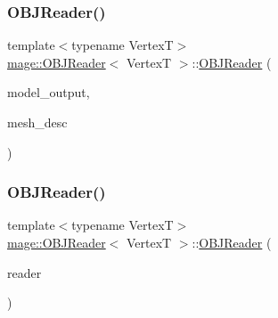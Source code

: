 \subsubsection{\texorpdfstring{O\+B\+J\+Reader()}{OBJReader()}\hspace{0.1cm}{\footnotesize\ttfamily [1/3]}}
{\footnotesize\ttfamily template$<$typename VertexT$>$ \\
\hyperlink{classmage_1_1_o_b_j_reader}{mage\+::\+O\+B\+J\+Reader}$<$ VertexT $>$\+::\hyperlink{classmage_1_1_o_b_j_reader}{O\+B\+J\+Reader} (\begin{DoxyParamCaption}\item[{\hyperlink{structmage_1_1_model_output}{Model\+Output}$<$ VertexT $>$ \&}]{model\+\_\+output,  }\item[{const \hyperlink{structmage_1_1_mesh_descriptor}{Mesh\+Descriptor}$<$ VertexT $>$ \&}]{mesh\+\_\+desc }\end{DoxyParamCaption})\hspace{0.3cm}{\ttfamily [explicit]}}

\hypertarget{classmage_1_1_o_b_j_reader_a8864bc1ca0520bf90e216415db772bbb}{}\label{classmage_1_1_o_b_j_reader_a8864bc1ca0520bf90e216415db772bbb} 
\subsubsection{\texorpdfstring{O\+B\+J\+Reader()}{OBJReader()}\hspace{0.1cm}{\footnotesize\ttfamily [2/3]}}
{\footnotesize\ttfamily template$<$typename VertexT$>$ \\
\hyperlink{classmage_1_1_o_b_j_reader}{mage\+::\+O\+B\+J\+Reader}$<$ VertexT $>$\+::\hyperlink{classmage_1_1_o_b_j_reader}{O\+B\+J\+Reader} (\begin{DoxyParamCaption}\item[{const \hyperlink{classmage_1_1_o_b_j_reader}{O\+B\+J\+Reader}$<$ VertexT $>$ \&}]{reader }\end{DoxyParamCaption})\hspace{0.3cm}{\ttfamily [delete]}}

\hypertarget{classmage_1_1_o_b_j_reader_ab25803656fb224d94227c1c121c733ee}{}\label{classmage_1_1_o_b_j_reader_ab25803656fb224d94227c1c121c733ee} 
